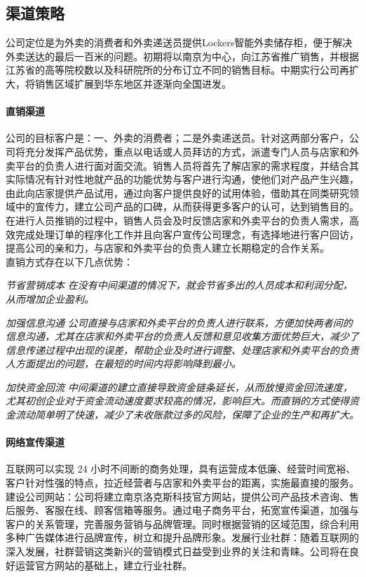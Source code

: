 \documentclass[violet]{main}
\begin{document}
			\subsection{渠道策略}
				公司定位是为外卖的消费者和外卖递送员提供Lockers智能外卖储存柜，便于解决外卖送达的最后一百米的问题。初期将以南京为中心，向江苏省推广销售，并根据江苏省的高等院校数以及科研院所的分布订立不同的销售目标。中期实行公司再扩大，将销售区域扩展到华东地区并逐渐向全国进发。
				\paragraph{直销渠道}
					公司的目标客户是：一、外卖的消费者；二是外卖递送员。针对这两部分客户，公司将充分发挥产品优势，重点以电话或人员拜访的方式，派遣专门人员与店家和外卖平台的负责人进行面对面交流。销售人员将首先了解店家的需求程度，并结合其实际情况有针对性地就产品的功能优势与客户进行沟通，使他们对产品产生兴趣，由此向店家提供产品试用，通过向客户提供良好的试用体验，借助其在同类研究领域中的宣传力，建立公司产品的口碑，从而获得更多客户的认可，达到销售目的。
					\\\indent 在进行人员推销的过程中，销售人员会及时反馈店家和外卖平台的负责人需求，高效完成处理订单的程序化工作并且向客户宣传公司理念，有选择地进行客户回访，提高公司的亲和力，与店家和外卖平台的负责人建立长期稳定的合作关系。 
					\\\indent 直销方式存在以下几点优势：
					\begin{strength2}{\it 节省营销成本}{}
						\it 在没有中间渠道的情况下，就会节省多出的人员成本和利润分配，从而增加企业盈利。
					\end{strength2}
					\begin{strength2}{\it 加强信息沟通}{}
						\it 公司直接与店家和外卖平台的负责人进行联系，方便加快两者间的信息沟通，尤其在店家和外卖平台的负责人反馈和意见收集方面优势巨大，减少了信息传递过程中出现的误差，帮助企业及时进行调整、处理店家和外卖平台的负责人方面提出的问题，在最短的时间内将影响降到最小。 
					\end{strength2}
					\begin{strength2}{\it 加快资金回流}{}
						\it 中间渠道的建立直接导致资金链条延长，从而放慢资金回流速度，尤其初创企业对于资金流动速度要求较高的情况，影响巨大。而直销的方式使得资金流动简单明了快速，减少了未收账款过多的风险，保障了企业的生产和再扩大。
					\end{strength2}
				\paragraph{网络宣传渠道}
					互联网可以实现 24 小时不间断的商务处理，具有运营成本低廉、经营时间宽裕、客户针对性强的特点，拉近经营者与店家和外卖平台的距离，实施最直接的服务。 建设公司网站：公司将建立南京洛克斯科技官方网站，提供公司产品技术咨询、售后服务、客服在线、顾客信箱等服务。通过电子商务平台，拓宽宣传渠道，加强与客户的关系管理，完善服务营销与品牌管理。同时根据营销的区域范围，综合利用多种广告媒体进行品牌宣传，树立和提升品牌形象。发展行业社群：随着互联网的深入发展，社群营销这类新兴的营销模式日益受到业界的关注和青睐。公司将在良好运营官方网站的基础上，建立行业社群。
\end{document}
